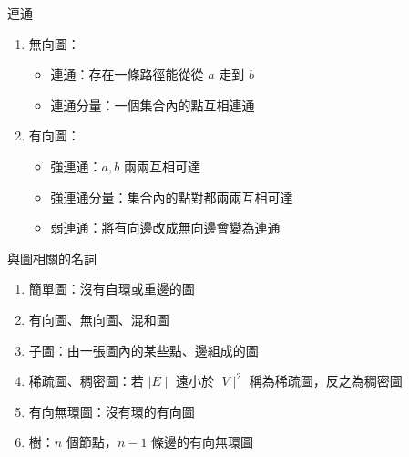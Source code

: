 \documentclass[aspectratio=169]{beamer}
\begin{document}
    \begin{frame}{連通}
        \begin{enumerate}
            \item 無向圖：
            \begin{itemize}
                \item 連通：存在一條路徑能從從 $a$ 走到 $b$
                \item 連通分量：一個集合內的點互相連通 
            \end{itemize}
            \item 有向圖：
            \begin{itemize}
                \item 強連通：$a, b$ 兩兩互相可達
                \item 強連通分量：集合內的點對都兩兩互相可達
                \item 弱連通：將有向邊改成無向邊會變為連通
            \end{itemize}
        \end{enumerate}
    \end{frame}

    \begin{frame}{與圖相關的名詞}
        \begin{enumerate}
            \item 簡單圖：沒有自環或重邊的圖
            \item 有向圖、無向圖、混和圖
            \item 子圖：由一張圖內的某些點、邊組成的圖
            \item 稀疏圖、稠密圖：若 $\mid E \mid$ 遠小於 $\mid V \mid ^ 2$ 稱為稀疏圖，反之為稠密圖
            \item 有向無環圖：沒有環的有向圖
            \item 樹：$n$ 個節點，$n-1$ 條邊的有向無環圖
        \end{enumerate}
    \end{frame}
\end{document}

